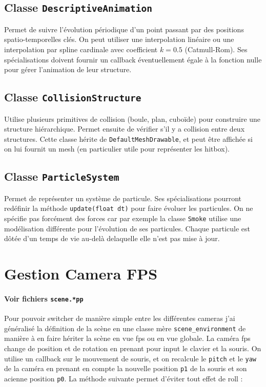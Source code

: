 \documentclass[10pt, a4paper]{article}
\theoremstyle{definition}
\begin{document}
\subsection{Classe \texttt{DescriptiveAnimation}}
Permet de suivre l'évolution périodique d'un point passant par des positions spatio-temporelles clés. On peut utiliser une interpolation linéaire ou une interpolation par spline cardinale avec coefficient $k = 0.5$ (Catmull-Rom). Ses spécialisations doivent fournir un callback éventuellement égale à la fonction nulle pour gérer l'animation de leur structure.

\subsection{Classe \texttt{CollisionStructure}}
Utilise plusieurs primitives de collision (boule, plan, cuboïde) pour construire une structure hiérarchique. Permet ensuite de vérifier s'il y a collision entre deux structures. Cette classe hérite de \texttt{DefaultMeshDrawable}, et peut être affichée si on lui fournit un mesh (en particulier utile pour représenter les hitbox).

\subsection{Classe \texttt{ParticleSystem}}
Permet de représenter un système de particule. Ses spécialisations pourront redéfinir la méthode \texttt{update(float dt)} pour faire évoluer les particules. On ne spécifie pas forcément des forces car par exemple la classe \texttt{Smoke} utilise une modélisation différente pour l'évolution de ses particules. Chaque particule est dôtée d'un temps de vie au-delà delaquelle elle n'est pas mise à jour.


\section{Gestion Camera FPS}
\paragraph{Voir fichiers \texttt{scene.*pp}} Pour pouvoir switcher de manière simple entre les différentes cameras j'ai généralisé la définition de la scène en une classe mère \texttt{scene\_environment} de manière à en faire hériter la scène en vue fps ou en vue globale. La caméra fps change de position et de rotation en prenant pour input le clavier et la souris. On utilise un callback sur le mouvement de souris, et on recalcule le \texttt{pitch} et le \texttt{yaw} de la caméra en prenant en compte la nouvelle position \texttt{p1} de la souris et son acienne position \texttt{p0}. La méthode suivante permet d'éviter tout effet de roll :
\end{document}
